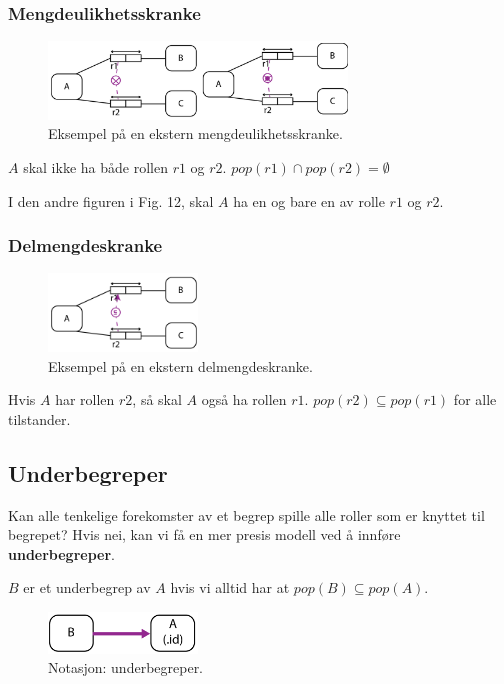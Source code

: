 \documentclass[11pt,a4paper]{article}
\begin{document}
\subsubsection{Mengdeulikhetsskranke}

\begin{figure}[h!]
	\centering
		\includegraphics[width=300px]{img/menu2-01.png}
	\caption{Eksempel på en ekstern mengdeulikhetsskranke.}
\end{figure}

$A$ skal ikke ha både rollen $r1$ og $r2$.
$pop(r1) \cap pop(r2) = \emptyset $

I den andre figuren i Fig. 12, skal $A$ ha en og bare en av rolle $r1$ og $r2$.

\subsubsection{Delmengdeskranke}

\begin{figure}[h!]
	\centering
		\includegraphics[width=150px]{img/delm-01.png}
	\caption{Eksempel på en ekstern delmengdeskranke.}
\end{figure}

Hvis $A$ har rollen $r2$, så skal $A$ også ha rollen $r1$.
$pop(r2) \subseteq pop(r1)$ for alle tilstander.

\subsection{Underbegreper}
Kan alle tenkelige forekomster av et begrep spille alle roller som er knyttet til begrepet? Hvis nei, kan vi få en mer presis modell ved å innføre \textbf{underbegreper}.

$B$ er et underbegrep av $A$ hvis vi alltid har at $pop(B) \subseteq pop(A)$.
\begin{figure}[h!]
	\centering
		\includegraphics[width=150px]{img/und-01.png}
	\caption{Notasjon: underbegreper.}
\end{figure}
\end{document}

